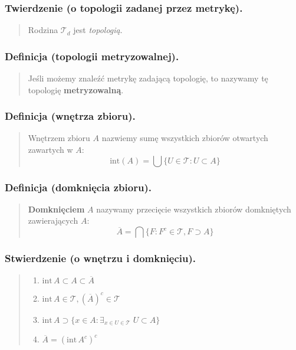 \documentclass[10pt,a4paper]{article}
\begin{document}
{    \subsubsection*{Twierdzenie (o topologii zadanej przez metrykę).}
    \begin{quote}
    Rodzina $\mathcal{T}_d$ jest \emph{topologią}.
    \end{quote}

    \subsubsection*{Definicja (topologii metryzowalnej).}
    \begin{quote}
    Jeśli możemy znaleźć metrykę zadającą topologię, to nazywamy tę topologię \textbf{metryzowalną}.
    \end{quote}

    \subsubsection*{Definicja (wnętrza zbioru).}
    \begin{quote}
        Wnętrzem zbioru $A$ nazwiemy sumę wszystkich zbiorów otwartych zawartych w $A$:
        $$\mathrm{int}(A) = \bigcup \{U \in \mathcal{T} : U \subset A\}$$
    \end{quote}

    \subsubsection*{Definicja (domknięcia zbioru).}
    \begin{quote}
    \textbf{Domknięciem} $A$ nazywamy przecięcie wszystkich zbiorów domkniętych zawierających $A$:
    $$\overline{A} = \bigcap \{F : F^c \in \mathcal{T}, F \supset A\}$$
    \end{quote}

    \subsubsection*{Stwierdzenie (o wnętrzu i domknięciu).}
    \begin{quote}
    \begin{enumerate}[label=\alph*)]
        \item $\mathrm{int}\, A \subset A \subset \overline{A}$
        \item $\mathrm{int}\, A \in \mathcal{T}, (\overline{A})^c \in \mathcal{T}$
        \item $\mathrm{int}\, A \supset \{x \in A: \exists_{x \in U \in \mathcal{T}} \; U \subset A\}$
        \item $\overline{A} = (\mathrm{int}\, A^c)^c$
    \end{enumerate}
    \end{quote}

}
\end{document}
